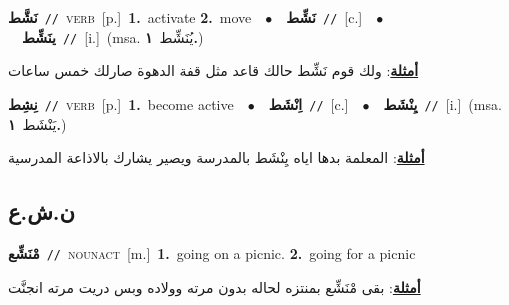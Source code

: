 \documentclass[10pt,a4paper,twoside]{article} %
\begin{document}
\begin{multicols}{2}
{\setlength\topsep{0pt}\textbf{\foreignlanguage{arabic}{نَشَّط}}\ {\color{gray}\texttt{//}\color{black}}\ \textsc{verb}\ [p.]\ \textbf{1.}~activate  \textbf{2.}~move\ \ $\bullet$\ \ \setlength\topsep{0pt}\textbf{\foreignlanguage{arabic}{نَشِّط}}\ {\color{gray}\texttt{//}\color{black}}\ [c.]\ \ $\bullet$\ \ \setlength\topsep{0pt}\textbf{\foreignlanguage{arabic}{ينَشِّط}}\ {\color{gray}\texttt{//}\color{black}}\ [i.]\ \color{gray}(msa. \foreignlanguage{arabic}{يُنَشِّط}~\foreignlanguage{arabic}{\textbf{١.}})\color{black}\  \begin{flushright}\color{gray}\foreignlanguage{arabic}{\textbf{\underline{\foreignlanguage{arabic}{أمثلة}}}: ولك قوم نَشِّط حالك قاعد مثل قفة الدهوة صارلك خمس ساعات}\end{flushright}\color{black}} \vspace{2mm}

{\setlength\topsep{0pt}\textbf{\foreignlanguage{arabic}{نِشِط}}\ {\color{gray}\texttt{//}\color{black}}\ \textsc{verb}\ [p.]\ \textbf{1.}~become active\ \ $\bullet$\ \ \setlength\topsep{0pt}\textbf{\foreignlanguage{arabic}{اِنْشَط}}\ {\color{gray}\texttt{//}\color{black}}\ [c.]\ \ $\bullet$\ \ \setlength\topsep{0pt}\textbf{\foreignlanguage{arabic}{يِنْشَط}}\ {\color{gray}\texttt{//}\color{black}}\ [i.]\ \color{gray}(msa. \foreignlanguage{arabic}{يَنْشَط}~\foreignlanguage{arabic}{\textbf{١.}})\color{black}\  \begin{flushright}\color{gray}\foreignlanguage{arabic}{\textbf{\underline{\foreignlanguage{arabic}{أمثلة}}}: المعلمة بدها اياه يِنْشَط بالمدرسة ويصير يشارك بالاذاعة المدرسية}\end{flushright}\color{black}} \vspace{2mm}

\vspace{-3mm}
\subsection*{\color{blue}\foreignlanguage{arabic}{ن.ش.ع}\color{blue}{}} 

{\setlength\topsep{0pt}\textbf{\foreignlanguage{arabic}{مْنَشِّع}}\ {\color{gray}\texttt{//}\color{black}}\ \textsc{noun\textunderscore act}\ [m.]\ \textbf{1.}~going on a picnic.  \textbf{2.}~going for a picnic\  \begin{flushright}\color{gray}\foreignlanguage{arabic}{\textbf{\underline{\foreignlanguage{arabic}{أمثلة}}}: بقى مْنَشِّع بمنتزه لحاله بدون مرته وولاده وبس دريت مرته انجنَّت}\end{flushright}\color{black}} \vspace{2mm}


\end{multicols}
\end{document}
